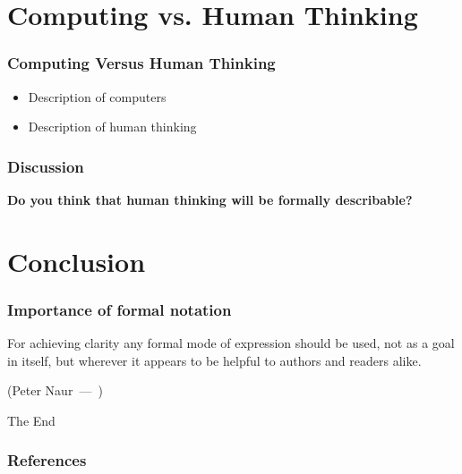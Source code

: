 \documentclass{beamer}
\let\oldquote\quote
\let\endoldquote\endquote
\renewenvironment{quote}[2][]
{\if\relax\detokenize{#1}\relax
	\def\quoteauthor{#2}%
	\else
	\def\quoteauthor{#2~---~#1}%
	\fi
	\oldquote}
{\par\nobreak\smallskip\hfill(\quoteauthor)%
	\endoldquote\addvspace{\bigskipamount}}
\begin{document}
\section{Computing vs. Human Thinking}


\begin{frame} %
	\frametitle{Computing Versus Human Thinking}
	\begin{itemize}
		\item Description of computers
		\item Description of human thinking
	\end{itemize}
\end{frame}


\begin{frame}
	\frametitle{Discussion}
	\textbf{Do you think that human thinking will be formally describable?}
\end{frame}


\section{Conclusion}

\begin{frame}[fragile] %
	\frametitle{Importance of formal notation}
	\begin{quote}{Peter Naur}
			For achieving clarity any formal mode of expression should be used, not as a goal in itself, but wherever it appears to be helpful to authors and readers alike.
	\end{quote}
\end{frame}



\begin{frame}
	\Huge{\centerline{The End}}
\end{frame}

\begin{frame}
	\frametitle{References}
	\footnotesize{
		
	}
\end{frame}
\end{document}
